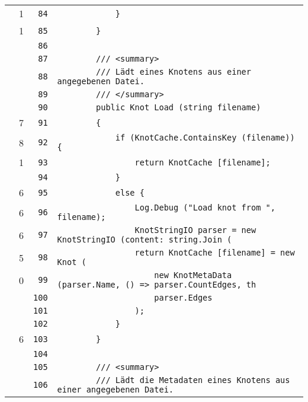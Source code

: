 \documentclass[a4paper,10pt]{article}
\begin{document}
\begin{longtable}[l]{lrrl}
\cellcolor{green} & 1 & \verb~84~ & \verb~            }~\\
\cellcolor{green} & 1 & \verb~85~ & \verb~        }~\\
\cellcolor{gray} &  & \verb~86~ & \verb~~\\
\cellcolor{gray} &  & \verb~87~ & \verb~        /// <summary>~\\
\cellcolor{gray} &  & \verb~88~ & \verb~        /// Lädt eines Knotens aus einer angegebenen Datei.~\\
\cellcolor{gray} &  & \verb~89~ & \verb~        /// </summary>~\\
\cellcolor{gray} &  & \verb~90~ & \verb~        public Knot Load (string filename)~\\
\cellcolor{green} & 7 & \verb~91~ & \verb~        {~\\
\cellcolor{green} & 8 & \verb~92~ & \verb~            if (KnotCache.ContainsKey (filename)) {~\\
\cellcolor{green} & 1 & \verb~93~ & \verb~                return KnotCache [filename];~\\
\cellcolor{gray} &  & \verb~94~ & \verb~            }~\\
\cellcolor{green} & 6 & \verb~95~ & \verb~            else {~\\
\cellcolor{green} & 6 & \verb~96~ & \verb~                Log.Debug ("Load knot from ", filename);~\\
\cellcolor{green} & 6 & \verb~97~ & \verb~                KnotStringIO parser = new KnotStringIO (content: string.Join (~\\
\cellcolor{green} & 5 & \verb~98~ & \verb~                return KnotCache [filename] = new Knot (~\\
\cellcolor{red} & 0 & \verb~99~ & \verb~                    new KnotMetaData (parser.Name, () => parser.CountEdges, th~\\
\cellcolor{gray} &  & \verb~100~ & \verb~                    parser.Edges~\\
\cellcolor{gray} &  & \verb~101~ & \verb~                );~\\
\cellcolor{gray} &  & \verb~102~ & \verb~            }~\\
\cellcolor{green} & 6 & \verb~103~ & \verb~        }~\\
\cellcolor{gray} &  & \verb~104~ & \verb~~\\
\cellcolor{gray} &  & \verb~105~ & \verb~        /// <summary>~\\
\cellcolor{gray} &  & \verb~106~ & \verb~        /// Lädt die Metadaten eines Knotens aus einer angegebenen Datei.~\\

\end{longtable}
\end{document}
